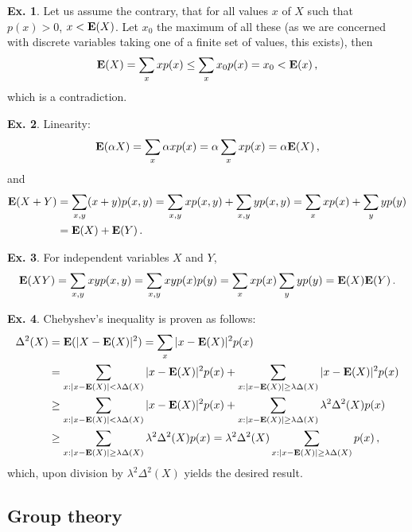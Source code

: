 \documentclass[a4paper,12pt]{article}
\theoremstyle{definition}
\newtheorem{exercise}{Ex.}[section]
\begin{document}
\begin{exercise}
 Let us assume the contrary, that for all values $x$ of $X$ such that $p(x) > 0$, $x< {\bf E}(X)$. Let $x_0$ the maximum of all these (as we are concerned with discrete variables taking one of a finite set of values, this exists), then
 \[
  {\bf E}(X) = \sum_x x p(x) \le \sum_x x_0 p(x) = x_0 < {\bf E}(x)\,,
 \]
 which is a contradiction.
\end{exercise}

\begin{exercise} Linearity:
 \[
  {\bf E}(\alpha X) = \sum_x \alpha x p(x) = \alpha \sum_x x p(x) = \alpha {\bf E}(X)\,,
 \]
 and
 \[\begin{aligned}
  {\bf E}(X + Y) &= \sum_{x, y} (x+y) p(x, y) = \sum_{x, y} x p(x, y) + \sum_{x, y} y p(x, y) = \sum_x x p(x) + \sum_y y p(y)\\ &= {\bf E}(X) + {\bf E}(Y)\,.
 \end{aligned}\]
\end{exercise}

\begin{exercise} For independent variables $X$ and $Y$,
 \[
  {\bf E}(X Y) = \sum_{x, y} xy p(x, y) = \sum_{x, y} xy p(x)p(y) = \sum_x x p(x) \sum_y yp(y) = {\bf E}(X) {\bf E}(Y)\,.
   \]
\end{exercise}

\begin{exercise}
 Chebyshev's inequality is proven as follows:
 \[\begin{aligned}
  \Delta^2(X)  &= {\bf E}(|X - {\bf E}(X)|^2) = \sum_x |x - {\bf E}(X)|^2 p(x)\\
  &= \sum_{x: |x-{\bf E}(X)| < \lambda \Delta(X)} |x - {\bf E}(X)|^2 p(x) + \sum_{x: |x-{\bf E}(X)| \ge \lambda \Delta(X)} |x - {\bf E}(X)|^2 p(x) \\
  &\ge \sum_{x: |x-{\bf E}(X)| < \lambda \Delta(X)} |x - {\bf E}(X)|^2 p(x) + \sum_{x: |x-{\bf E}(X)| \ge \lambda \Delta(X)} \lambda^2 \Delta^2(X) p(x)\\
  &\ge \sum_{x: |x-{\bf E}(X)| \ge \lambda \Delta(X)} \lambda^2 \Delta^2(X) p(x) = \lambda^2 \Delta^2(X) \sum_{x: |x-{\bf E}(X)| \ge \lambda \Delta(X)} p(x)\,,
 \end{aligned}\]
 which, upon division by $\lambda^2 \Delta^2(X)$ yields the desired result.
\end{exercise}

\subsection{Group theory}\label{app:groupTheory}
\end{document}
